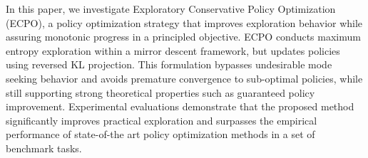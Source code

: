 
In this paper, we investigate Exploratory Conservative Policy Optimization (ECPO), a policy optimization strategy that improves exploration behavior while assuring monotonic progress in a principled objective. ECPO conducts maximum entropy exploration within a mirror descent framework, but updates policies using reversed KL projection. This formulation bypasses undesirable mode seeking behavior and avoids premature convergence to sub-optimal policies, while still supporting strong theoretical properties such as guaranteed policy improvement. Experimental evaluations demonstrate that the proposed method significantly improves practical exploration and surpasses the empirical performance of state-of-the art policy optimization methods in a set of benchmark tasks.

